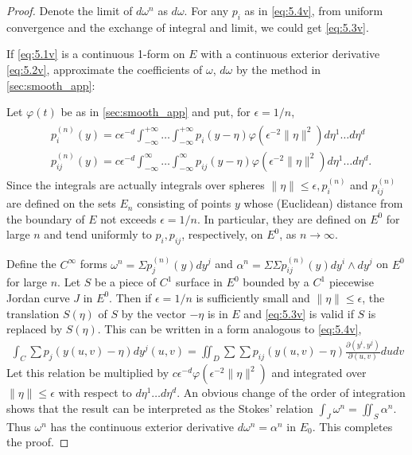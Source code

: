 \documentclass{article}
\begin{document}
\begin{proof}
 Denote the limit of $d \omega^{n}$ as $d \omega$. For any $p_i$ as in \cref{eq:5.4v}, from uniform convergence and the exchange of integral and limit, we could get \cref{eq:5.3v}.

 If \cref{eq:5.1v} is a continuous 1-form on $E$ with a continuous exterior derivative \cref{eq:5.2v}, approximate the coefficients of $\omega$, $d\omega$ by the method in \cref{sec:smooth_app}: 

Let $\varphi(t)$ be as in \cref{sec:smooth_app} and put, for $\epsilon=1 / n$,
\begin{align*}
\begin{aligned}
&p_{i}^{(n)}(y)=c \epsilon^{-d} \int_{-\infty}^{+\infty} \ldots \int_{-\infty}^{+\infty} p_{i}(y-\eta) \varphi\left(\epsilon^{-2}\|\eta\|^{2}\right) d \eta^{1} \ldots d \eta^{d} \\
&p_{i j}^{(n)}(y)=c \epsilon^{-d} \int_{-\infty}^{\infty} \ldots \int_{-\infty}^{\infty} p_{i j}(y-\eta) \varphi\left(\epsilon^{-2}\|\eta\|^{2}\right) d \eta^{1} \ldots d \eta^{d} .
\end{aligned}
\end{align*}
Since the integrals are actually integrals over spheres $\|\eta\| \le \epsilon, p_{i}^{(n)}$ and $p_{i j}^{(n)}$ are defined on the sets $E_{n}$ consisting of points $y$ whose (Euclidean) distance from the boundary of $E$ not exceeds $\epsilon=1 / n$. In particular, they are defined on $E^{0}$ for large $n$ and tend uniformly to $p_{i}, p_{i j}$, respectively, on $E^{0}$, as $n \rightarrow \infty$.

Define the $C^{\infty}$ forms $\omega^{n}=\Sigma p_{j}^{(n)}(y) d y^{j}$ and $\alpha^{n}=\Sigma \Sigma p_{i j}^{(n)}(y) d y^{i} \wedge d y^{j}$ on $E^{0}$ for large $n$. Let $S$ be a piece of $C^{1}$ surface in $E^{0}$ bounded by a $C^{1}$ piecewise Jordan curve $J$ in $E^{0}$. Then if $\epsilon=1 / n$ is sufficiently small and $\|\eta\| \le \epsilon$, the translation $S(\eta)$ of $S$ by the vector $-\eta$ is in $E$ and \cref{eq:5.3v} is valid if $S$ is replaced by $S(\eta)$. This can be written in a form analogous to \cref{eq:5.4v},
\begin{align*}
\int_{C} \sum p_{j}(y(u, v)-\eta) d y^{j}(u, v)=\iint_{D} \sum \sum p_{i j}(y(u, v)-\eta) \frac{\partial\left(y^{i}, y^{j}\right)}{\partial(u, v)} d u d v
\end{align*}
Let this relation be multiplied by $c \epsilon^{-d} \varphi\left(\epsilon^{-2}\|\eta\|^{2}\right)$ and integrated over $\|\eta\| \le \epsilon$ with respect to $d \eta^{1} \ldots d \eta^{d} .$ An obvious change of the order of integration shows that the result can be interpreted as the Stokes' relation $\int_{J} \omega^{n}=\iint_{S} \alpha^{n} .$ Thus $\omega^{n}$ has the continuous exterior derivative $d \omega^{n}=\alpha^{n}$ in $E_{0}$. This completes the proof.
\end{proof}
\end{document}
